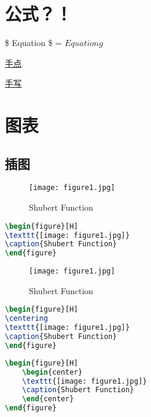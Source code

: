 \documentclass[a4paper,12pt]{article}
\begin{document}
\section{公式？！}
\$ Equation \$ = $ Equationg $

\href{http://www.sciweavers.org/free-online-latex-equation-editor}{手点}


\href{http://webdemo.visionobjects.com/home.html;jsessionid=1mk45ecrnd2zk1l5x938b6sd4y?locale=zh_CN#equation}{手写}





\section{图表}
\subsection{插图}

\begin{figure}[H]
\texttt{[image: figure1.jpg]}
\caption{Shubert Function}
\end{figure}

\begin{lstlisting}[language=TeX,numbers=none,frame=lrtb,keywords={begin},label=Gamma,caption=Gamma]
\begin{figure}[H]
\texttt{[image: figure1.jpg]}
\caption{Shubert Function}
\end{figure}
\end{lstlisting}

\begin{figure}[H]
\centering
\texttt{[image: figure1.jpg]}
\caption{Shubert Function}
\end{figure}

\begin{lstlisting}[language=TeX,numbers=none,frame=lrtb,keywords={begin},label=Gamma,caption=Gamma]
\begin{figure}[H]
\centering
\texttt{[image: figure1.jpg]}
\caption{Shubert Function}
\end{figure}
\end{lstlisting}
\begin{lstlisting}[language=TeX,numbers=none,frame=lrtb,keywords={begin},label=Gamma,caption=Gamma]
\begin{figure}[H]
	\begin{center}
	\texttt{[image: figure1.jpg]}
	\caption{Shubert Function}
	\end{center}
\end{figure}
\end{lstlisting}
\end{document}
